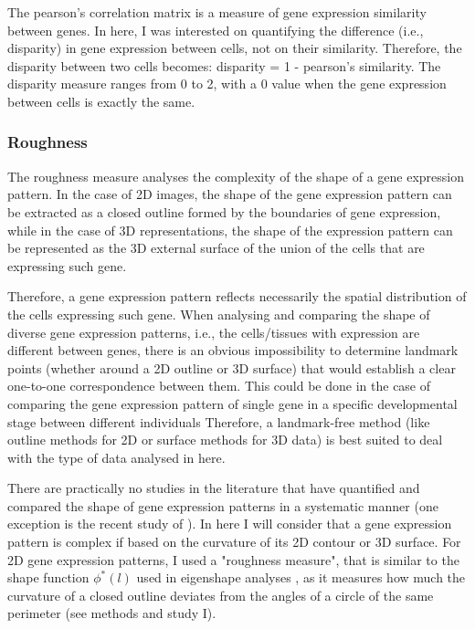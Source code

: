 The pearson's correlation matrix is a measure of gene expression similarity between genes. In here, I was interested on quantifying the difference (i.e., disparity) in gene expression between cells, not on their similarity. Therefore, the disparity between two cells becomes: disparity = 1 - pearson's similarity. The disparity measure ranges from 0 to 2, with a 0 value when the gene expression between cells is exactly the same.


\subsubsection{Roughness}

The roughness measure analyses the complexity of the shape of a gene expression pattern. In the case of 2D images, the shape of the gene expression pattern can be extracted as a closed outline formed by the boundaries of gene expression, while in the case of 3D representations, the shape of the expression pattern can be represented as the 3D external surface of the union of the cells that are expressing such gene.

Therefore, a gene expression pattern reflects necessarily the spatial distribution of the cells expressing such gene. When analysing and comparing the shape of diverse gene expression patterns, i.e., the cells/tissues with expression are different between genes, there is an obvious impossibility to determine landmark points (whether around a 2D outline or 3D surface) that would establish a clear one-to-one correspondence between them. This could be done in the case of comparing the gene expression pattern of single gene in a specific developmental stage between different individuals 
Therefore, a landmark-free method (like outline methods for 2D or surface methods for 3D data) is best suited to deal with the type of data analysed in here.

There are practically no studies in the literature that have quantified and compared the shape of gene expression patterns in a systematic manner (one exception is the recent study of \citealp{Martinez-Abadias2016}). In here I will consider that a gene expression pattern is complex if based on the curvature of its 2D contour or 3D surface.
For 2D gene expression patterns, I used a "roughness measure", that is similar to the shape function $\phi^{*}(l)$ used in eigenshape analyses \citep{Lohmann1983}, as it measures how much the curvature of a closed outline deviates from the angles of a circle of the same perimeter (see methods and study I). 


